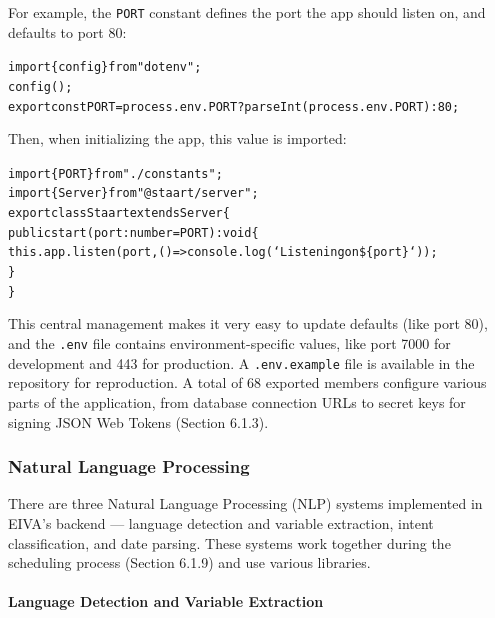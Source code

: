 \documentclass{article}
\begin{document}
For example, the \texttt{PORT} constant defines the port the app should listen on, and defaults to port 80:

\begin{alltt}
\textcolor{keyword}{import} \{ config \} \textcolor{keyword}{from} \textcolor{string}{"dotenv"};
\textcolor{variable}{config}();
\textcolor{keyword}{export const} \textcolor{symbol}{PORT} = process.\textcolor{variable}{env}.\textcolor{symbol}{PORT} ? parseInt(process.\textcolor{variable}{env}.\textcolor{symbol}{PORT}) : \textcolor{literal}{80};
\end{alltt}

Then, when initializing the app, this value is imported:

\begin{alltt}
\textcolor{keyword}{import} \{ PORT \} \textcolor{keyword}{from} \textcolor{string}{"./constants"};
\textcolor{keyword}{import} \{ Server \} \textcolor{keyword}{from} \textcolor{string}{"@staart/server"};
\textcolor{keyword}{export class} Staart \textcolor{keyword}{extends} Server \{
  \textcolor{keyword}{public} start(port: number = \textcolor{symbol}{PORT}): \textcolor{keyword}{void} \{
    this.\textcolor{variable}{app}.\textcolor{variable}{listen}(port, () => console.\textcolor{variable}{log}(\textcolor{string}{`Listening on} \$\{port\}\textcolor{string}{`}));
  \}
\}
\end{alltt}

This central management makes it very easy to update defaults (like port 80), and the \texttt{.env} file contains environment-specific values, like port 7000 for development and 443 for production. A \texttt{.env.example} file is available in the repository for reproduction. A total of 68 exported members configure various parts of the application, from database connection URLs to secret keys for signing JSON Web Tokens (Section 6.1.3).

\subsubsection{Natural Language Processing}

There are three Natural Language Processing (NLP) systems implemented in EIVA's backend --- language detection and variable extraction, intent classification, and date parsing. These systems work together during the scheduling process (Section 6.1.9) and use various libraries.

\paragraph{Language Detection and Variable Extraction}
\end{document}
